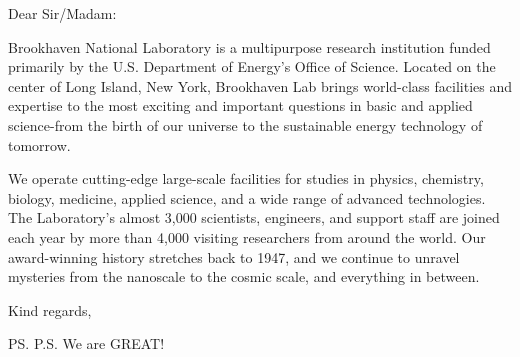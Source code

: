 \documentclass[12pt]{letter}
\date{\today}
\begin{document}
\begin{letter}{}

\opening{Dear Sir/Madam:}

Brookhaven National Laboratory is a multipurpose research institution
funded primarily by the U.S. Department of Energy's Office of
Science. Located on the center of Long Island, New York, Brookhaven
Lab brings world-class facilities and expertise to the most exciting
and important questions in basic and applied science-from the birth of
our universe to the sustainable energy technology of tomorrow.

We operate cutting-edge large-scale facilities for studies in physics,
chemistry, biology, medicine, applied science, and a wide range of
advanced technologies. The Laboratory's almost 3,000 scientists,
engineers, and support staff are joined each year by more than 4,000
visiting researchers from around the world. Our award-winning history
stretches back to 1947, and we continue to unravel mysteries from the
nanoscale to the cosmic scale, and everything in between.


\closing{Kind regards,}

\ps{P.S. We are GREAT!}
\end{letter}
\end{document}
